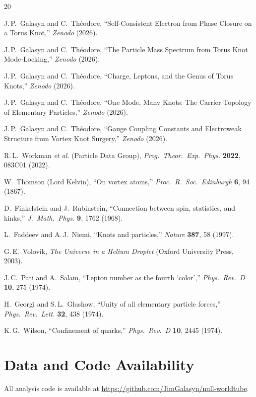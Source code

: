 \documentclass[11pt,a4paper]{article}
\begin{document}
\begin{thebibliography}{20}

J.\,P.~Galasyn and C.~Th\'eodore,
``Self-Consistent Electron from Phase Closure on a Torus Knot,''
\emph{Zenodo} (2026).

J.\,P.~Galasyn and C.~Th\'eodore,
``The Particle Mass Spectrum from Torus Knot Mode-Locking,''
\emph{Zenodo} (2026).

J.\,P.~Galasyn and C.~Th\'eodore,
``Charge, Leptons, and the Genus of Torus Knots,''
\emph{Zenodo} (2026).

J.\,P.~Galasyn and C.~Th\'eodore,
``One Mode, Many Knots: The Carrier Topology of Elementary Particles,''
\emph{Zenodo} (2026).

J.\,P.~Galasyn and C.~Th\'eodore,
``Gauge Coupling Constants and Electroweak Structure from Vortex
Knot Surgery,''
\emph{Zenodo} (2026).

R.\,L.~Workman \textit{et al.} (Particle Data Group),
\emph{Prog.\ Theor.\ Exp.\ Phys.} \textbf{2022}, 083C01 (2022).

W.~Thomson (Lord Kelvin),
``On vortex atoms,''
\emph{Proc.\ R.\ Soc.\ Edinburgh} \textbf{6}, 94 (1867).

D.~Finkelstein and J.~Rubinstein,
``Connection between spin, statistics, and kinks,''
\emph{J.\ Math.\ Phys.} \textbf{9}, 1762 (1968).

L.~Faddeev and A.\,J.~Niemi,
``Knots and particles,''
\emph{Nature} \textbf{387}, 58 (1997).

G.\,E.~Volovik,
\emph{The Universe in a Helium Droplet}
(Oxford University Press, 2003).

J.\,C.~Pati and A.~Salam,
``Lepton number as the fourth `color',''
\emph{Phys.\ Rev.\ D} \textbf{10}, 275 (1974).

H.~Georgi and S.\,L.~Glashow,
``Unity of all elementary particle forces,''
\emph{Phys.\ Rev.\ Lett.} \textbf{32}, 438 (1974).

K.\,G.~Wilson,
``Confinement of quarks,''
\emph{Phys.\ Rev.\ D} \textbf{10}, 2445 (1974).

\end{thebibliography}

\section*{Data and Code Availability}

All analysis code is available at
\url{https://github.com/JimGalasyn/null-worldtube}.
\end{document}
